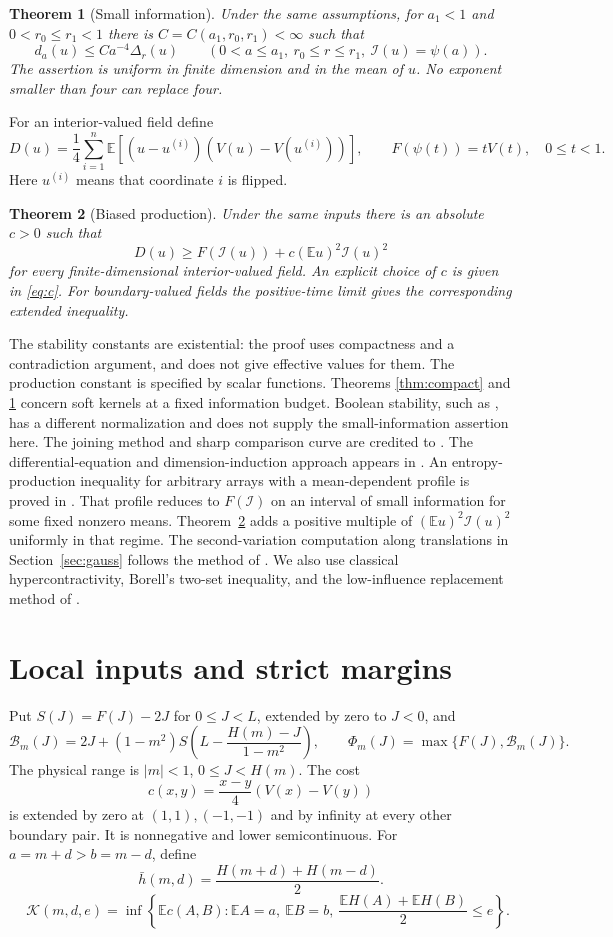 \documentclass[11pt,reqno]{amsart}
\numberwithin{equation}{section}
\newtheorem{theorem}{Theorem}[section]
\theoremstyle{definition}
\theoremstyle{remark}
\newcommand{\E}{\mathbb E}
\newcommand{\cB}{\mathcal B}
\newcommand{\cK}{\mathcal K}
\newcommand{\cI}{\mathcal I}
\begin{document}
\begin{theorem}[Small information]\label{thm:endpoint}
Under the same assumptions, for $a_1<1$ and
$0<r_0\le r_1<1$ there is $C=C(a_1,r_0,r_1)<\infty$ such that
\[
 d_a(u)\le C a^{-4}\Delta_r(u)
 \qquad(0<a\le a_1,\ r_0\le r\le r_1,\ \cI(u)=\psi(a)).
\]
The assertion is uniform in finite dimension and in the mean of $u$.
No exponent smaller than four can replace four.
\end{theorem}

For an interior-valued field define
\[
 D(u)=\frac14\sum_{i=1}^n
 \E[(u-u^{(i)})(V(u)-V(u^{(i)}))],\qquad
 F(\psi(t))=tV(t),\quad 0\le t<1.
\]
Here $u^{(i)}$ means that coordinate $i$ is flipped.

\begin{theorem}[Biased production]\label{thm:production}
Under the same inputs there is an absolute $c>0$ such that
\[
 D(u)\ge F(\cI(u))+c(\E u)^2\cI(u)^2
\]
for every finite-dimensional interior-valued field. An explicit choice
of $c$ is given in \eqref{eq:c}. For boundary-valued fields the
positive-time limit gives the corresponding extended inequality.
\end{theorem}

The stability constants are existential: the proof uses compactness and
a contradiction argument, and does not give effective values for them.
The production constant is specified by scalar functions. Theorems
\ref{thm:compact} and \ref{thm:endpoint} concern soft kernels at a fixed
information budget. Boolean stability, such as \cite{KT}, has a different
normalization and does not supply the small-information assertion here.
The joining method and sharp comparison curve are credited to
\cite{OpenAI}. The differential-equation and dimension-induction approach
appears in \cite{CGN}. An entropy-production inequality for arbitrary
arrays with a mean-dependent profile is proved in
\cite[Section~9, Lemma~9.2]{CGJLMNW}. That profile reduces to $F(\cI)$
on an interval of small information for some fixed nonzero means.
Theorem~\ref{thm:production} adds a positive multiple of
$(\E u)^2\cI(u)^2$ uniformly in that regime.
The second-variation computation along translations in
Section~\ref{sec:gauss} follows the method of
\cite[Lemmas~5.1 and~5.3]{HT}.
We also use classical hypercontractivity, Borell's two-set inequality,
and the low-influence replacement method of \cite{MOO}.

\section{Local inputs and strict margins}\label{sec:inputs}
Put $S(J)=F(J)-2J$ for $0\le J<L$, extended by zero to $J<0$, and
\[
 \cB_m(J)=2J+(1-m^2)S\left(L-\frac{H(m)-J}{1-m^2}\right),
 \qquad \Phi_m(J)=\max\{F(J),\cB_m(J)\}.
\]
The physical range is $|m|<1$, $0\le J<H(m)$.
The cost
\[
 c(x,y)=\frac{x-y}{4}(V(x)-V(y))
\]
is extended by zero at $(1,1),(-1,-1)$ and by infinity at every other
boundary pair. It is nonnegative and lower semicontinuous.
For $a=m+d>b=m-d$, define
\[
 \bar h(m,d)=\frac{H(m+d)+H(m-d)}2.
\]
\[
 \quad \cK(m,d,e)=\inf\left\{\E c(A,B):
 \E A=a,\ \E B=b,\ \frac{\E H(A)+\E H(B)}2\le e\right\}.
\]
\end{document}
